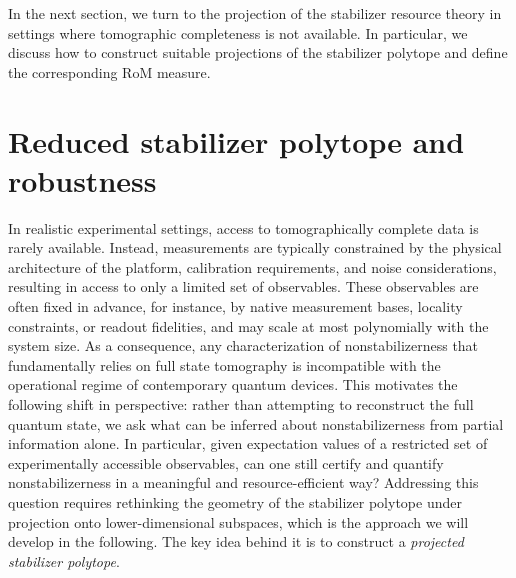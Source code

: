 \documentclass[10pt,aps,pra,twocolumn,floatfix,nofootinbib,superscriptaddress,longbibliography]{revtex4-2}
\newcommand{\1}{\mathbbm{1}}
\begin{document}
In the next section, we turn to the projection of the stabilizer resource theory in settings where tomographic completeness is not available. In particular, we discuss how to construct suitable projections of the stabilizer polytope and define the corresponding RoM measure.

\section{Reduced stabilizer polytope and robustness}
\label{sec:reduxstab}

In realistic experimental settings, access to tomographically complete data is rarely available. Instead, measurements are typically constrained by the physical architecture of the platform, calibration requirements, and noise considerations, resulting in access to only a limited set of observables. These observables are often fixed in advance, for instance, by native measurement bases, locality constraints, or readout fidelities, and may scale at most polynomially with the system size. As a consequence, any characterization of nonstabilizerness that fundamentally relies on full state tomography is incompatible with the operational regime of contemporary quantum devices. This motivates the following shift in perspective: rather than attempting to reconstruct the full quantum state, we ask what can be inferred about nonstabilizerness from partial information alone. In particular, given expectation values of a restricted set of experimentally accessible observables, can one still certify and quantify nonstabilizerness in a meaningful and resource-efficient way? Addressing this question requires rethinking the geometry of the stabilizer polytope under projection onto lower-dimensional subspaces, which is the approach we will develop in the following. The key idea behind it is to construct a \emph{projected stabilizer polytope}.
\end{document}
